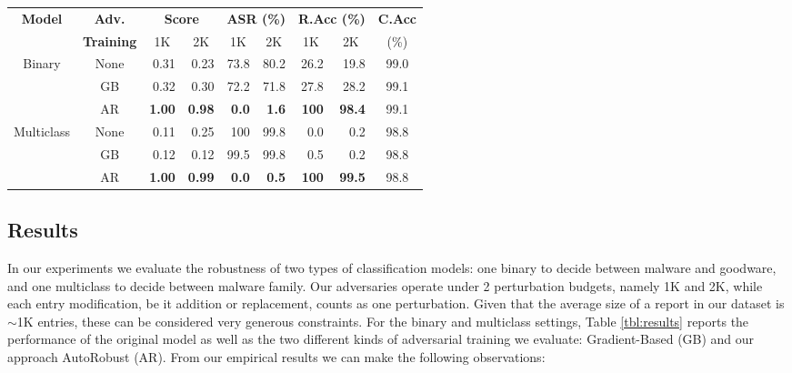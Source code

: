 \begin{table*}[!ht]
    \centering
    \caption[Performance of AutoRobust (AR), gradient-based (GB) adversarial training, and the vanilla HMIL model.]{Performance of AutoRobust (AR), gradient-based (GB) adversarial training, and the original vanilla HMIL model considering the two perturbation budgets, 1K and 2K. The metrics displayed are: Score (of the origin class), Attack Success Rate (ASR), Clean Accuracy (C.Acc), and Robust Accuracy (R.Acc), all reported on the same hold-out test set.}
    \begin{tabular}{c|c|r|r|r|r|r|r|c}
    \toprule
    \multirow{2}{*}{\textbf{Model}} & \textbf{\small Adv.} & \multicolumn{2}{c|}{\textbf{Score}} & \multicolumn{2}{c|}{\textbf{ASR (\%)}} & \multicolumn{2}{c|}{\textbf{R.Acc (\%)}} & \textbf{C.Acc} \\
    & \textbf{\small Training} & \multicolumn{1}{c}{1K} & \multicolumn{1}{c|}{2K} & \multicolumn{1}{c}{1K} & \multicolumn{1}{c|}{2K} & \multicolumn{1}{c}{1K} & \multicolumn{1}{c|}{2K} & (\%)\\
    \midrule
    \multirow{3}{*}{Binary} & None & 0.31 & 0.23 & 73.8 & 80.2 & 26.2 & 19.8 & 99.0 \\
    & GB & 0.32 & 0.30 & 72.2 & 71.8 & 27.8 & 28.2 & 99.1 \\
    & AR & \textbf{1.00} & \textbf{0.98} & \textbf{0.0} & \textbf{1.6} & \textbf{100} & \textbf{98.4} & 99.1 \\
    \midrule
    \multirow{3}{*}{Multiclass} & None & 0.11 & 0.25 & 100 & 99.8 & 0.0 & 0.2 & 98.8 \\
    & GB & 0.12 & 0.12 & 99.5 & 99.8 & 0.5 & 0.2 & 98.8 \\
    & AR & \textbf{1.00} & \textbf{0.99} & \textbf{0.0} & \textbf{0.5} & \textbf{100} & \textbf{99.5} & 98.8 \\
    \bottomrule
    \end{tabular}
    \label{tbl:results}
\end{table*}

\subsection{Results}
In our experiments we evaluate the robustness of two types of classification models: one binary to decide between malware and goodware, and one multiclass to decide between malware family.
Our adversaries operate under 2 perturbation budgets, namely 1K and 2K, while each entry modification, be it addition or replacement, counts as one perturbation.
Given that the average size of a report in our dataset is $\sim$1K entries, these can be considered very generous constraints.
For the binary and multiclass settings, Table \ref{tbl:results} reports the performance of the original model as well as the two different kinds of adversarial training we evaluate: Gradient-Based (GB) and our approach AutoRobust (AR).
From our empirical results we can make the following observations:

